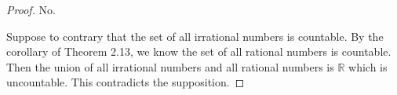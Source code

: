 \begin{Exercise}
\begin{proof}
No. 

Suppose to contrary that the set of all irrational numbers is countable. By the corollary of Theorem 2.13, we know the set of all rational numbers is countable. Then the union of all irrational numbers and all rational numbers is $\mathbb{R}$ which is uncountable. This contradicts the supposition.
\end{proof}
\end{Exercise}